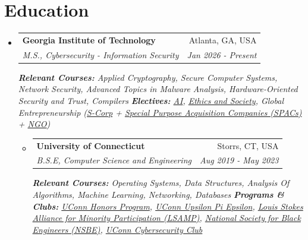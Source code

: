 \documentclass[a4paper,11pt]{article}
\makeatletter
\newcommand{\resumeSubheading}[4]{
  \vspace{-1pt}\item
    \begin{tabular*}{0.97\textwidth}{l@{\extracolsep{\fill}}r}
      \textbf{#1} & #2 \\
      \textit{#3} & \textit{#4} \\
    \end{tabular*}\vspace{-5pt}
}
\newcommand{\resumeSubHeadingListStart}{\begin{itemize}[leftmargin=*]}
\makeatother
\begin{document}
\section{Education}
\vspace{5pt}
  \begin{itemize}[leftmargin=0pt, label={}]  %
    \resumeSubheading
      {Georgia Institute of Technology}{Atlanta, GA, USA}
      {M.S., Cybersecurity - Information Security}{Jan 2026 - Present}
      \vspace{5pt}
      {\scriptsize \textit{ \footnotesize{\newline{}\textbf{Relevant Courses:} Applied Cryptography, Secure Computer Systems, Network Security, Advanced Topics in Malware Analysis, Hardware-Oriented Security and Trust, Compilers}}}
      \vspace{2pt}
	  {\scriptsize \textit{ \footnotesize{\newline{}\textbf{Electives:} \href{https://www.nature.com/articles/nature16961}{AI}, \href{https://link.springer.com/journal/11569}{Ethics and Society}, Global Entrepreneurship (\href{https://www.investopedia.com/terms/s/subchapters.asp}{S-Corp} + \href{https://www.investopedia.com/terms/s/spac.asp}{Special Purpose Acquisition Companies (SPACs)} + \href{https://en.wikipedia.org/wiki/Non-governmental_organization}{NGO})}}}
      \vspace{2pt}
  \begin{itemize}[leftmargin=0pt, label={}]  %
    \resumeSubheading
      {University of Connecticut}{Storrs, CT, USA}
      {B.S.E, Computer Science and Engineering}{Aug 2019 - May 2023}
      \vspace{5pt}
      {\scriptsize \textit{ \footnotesize{\newline{}\textbf{Relevant Courses:} Operating Systems, Data Structures, Analysis Of Algorithms, Machine Learning, Networking, Databases}}}
      {\scriptsize \textit{ \footnotesize{\newline{}\textbf{Programs \& Clubs:}
  \href{https://honors.uconn.edu/}{UConn Honors Program}, \href{https://github.com/UConn-UPE}{UConn Upsilon Pi Epsilon}, \href{https://www.nsf.gov/funding/opportunities/lsamp-louis-stokes-alliances-minority-participation}{Louis Stokes Alliance for Minority Participation (LSAMP)}, \href{https://nsbe.org/}{National Society for Black Engineers (NSBE)}, \href{https://uconntact.uconn.edu/organization/uconncyber}{UConn Cybersecurity Club}}}}
  \end{itemize}
  \end{itemize}
\end{document}
